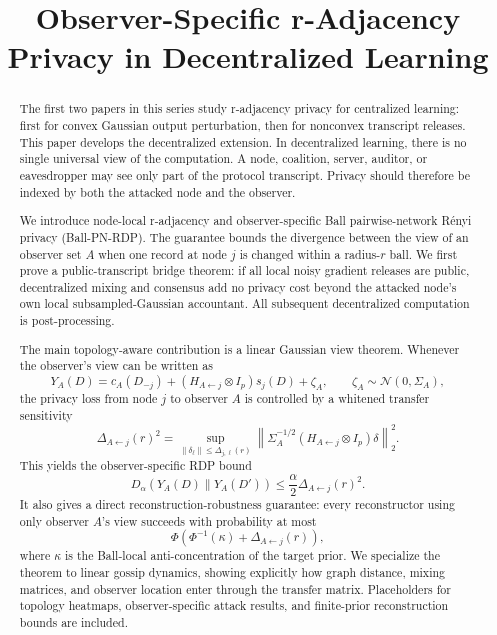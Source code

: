 \documentclass[conference,compsoc]{IEEEtran}
\title{Observer-Specific r-Adjacency Privacy in Decentralized Learning}
\author{}
\begin{document}
\maketitle

\begin{abstract}
The first two papers in this series study r-adjacency privacy for centralized learning: first for convex Gaussian output perturbation, then for nonconvex transcript releases. This paper develops the decentralized extension. In decentralized learning, there is no single universal view of the computation. A node, coalition, server, auditor, or eavesdropper may see only part of the protocol transcript. Privacy should therefore be indexed by both the attacked node and the observer.

We introduce node-local r-adjacency and observer-specific Ball pairwise-network R\'enyi privacy (Ball-PN-RDP). The guarantee bounds the divergence between the view of an observer set $A$ when one record at node $j$ is changed within a radius-$r$ ball. We first prove a public-transcript bridge theorem: if all local noisy gradient releases are public, decentralized mixing and consensus add no privacy cost beyond the attacked node's own local subsampled-Gaussian accountant. All subsequent decentralized computation is post-processing.

The main topology-aware contribution is a linear Gaussian view theorem. Whenever the observer's view can be written as
\[
Y_A(D)=c_A(D_{-j})+(H_{A\leftarrow j}\otimes I_p)s_j(D)+\zeta_A,
\qquad
\zeta_A\sim\mathcal N(0,\Sigma_A),
\]
the privacy loss from node $j$ to observer $A$ is controlled by a whitened transfer sensitivity
\[
\Delta_{A\leftarrow j}(r)^2
=\sup_{\|\delta_\ell\|\le\Delta_{j,\ell}(r)}
\left\|\Sigma_A^{-1/2}(H_{A\leftarrow j}\otimes I_p)\delta\right\|_2^2.
\]
This yields the observer-specific RDP bound
\[
D_\alpha(Y_A(D)\|Y_A(D'))\le \frac{\alpha}{2}\Delta_{A\leftarrow j}(r)^2.
\]
It also gives a direct reconstruction-robustness guarantee: every reconstructor using only observer $A$'s view succeeds with probability at most
\[
\Phi\!\left(\Phi^{-1}(\kappa)+\Delta_{A\leftarrow j}(r)\right),
\]
where $\kappa$ is the Ball-local anti-concentration of the target prior. We specialize the theorem to linear gossip dynamics, showing explicitly how graph distance, mixing matrices, and observer location enter through the transfer matrix. Placeholders for topology heatmaps, observer-specific attack results, and finite-prior reconstruction bounds are included.
\end{abstract}
\end{document}
